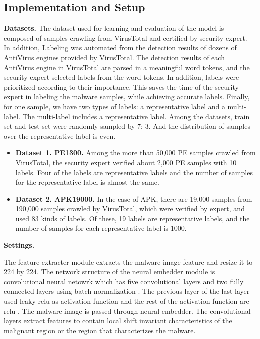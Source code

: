 \subsection{Implementation and Setup}
\textbf{Datasets. } 
The dataset used for learning and evaluation of the model is composed of samples crawling from VirusTotal\cite{total2012virustotal} and certified by security expert. In addition, Labeling was automated from the detection results of dozens of AntiVirus engines provided by VirusTotal. The detection results of each AntiVirus engine in VirusTotal are parsed in a meaningful word tokens, and the security expert selected labels from the word tokens. In addition, labels were prioritized according to their importance. This saves the time of the security expert in labeling the malware samples, while achieving accurate labels. Finally, for one sample, we have two types of labels: a representative label and a multi-label. The multi-label includes a representative label. Among the datasets, train set and test set were randomly sampled by 7: 3. And the distribution of samples over the representative label is even.

\begin{itemize}
	\item{ \textbf{Dataset 1. PE1300. } Among the more than 50,000 PE samples crawled from VirusTotal, the security expert verified about 2,000 PE samples with 10 labels. Four of the labels are representative labels and the number of samples for the representative label is almost the same.
	}
	\item{ \textbf{Dataset 2. APK19000. } In the case of APK, there are 19,000 samples from 190,000 samples crawled by VirusTotal, which were verified by expert, and used 83 kinds of labels. Of these, 19 labels are representative labels, and the number of samples for each representative label is 1000.
	}
\end{itemize}

\textbf{Settings. }

The feature extracter module extracts the malware image feature \cite{nataraj2011malware} and resize it to 224 by 224.
The network structure of the neural embedder module is convolutional neural netowrk which has five convolutional layers and two fully connected layers using batch normalization \cite{ioffe2015batch}. The previous layer of the last layer used leaky relu\cite{xu2015empirical} as activation function and the rest of the activation function are relu \cite{nair2010rectified}. 
The malware image \cite{nataraj2011malware} is passed through neural embedder. The convolutional layers extract features to contain local shift invariant characteristics of the malignant region or the region that characterizes the malware.

